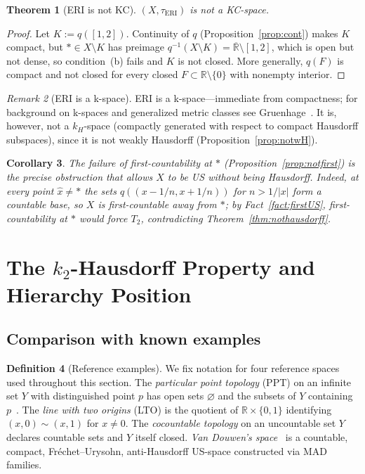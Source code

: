 \documentclass[11pt]{article}
\newtheorem{theorem}{Theorem}[section]
\newtheorem{corollary}[theorem]{Corollary}
\theoremstyle{definition}
\newtheorem{definition}[theorem]{Definition}
\theoremstyle{remark}
\newtheorem{remark}[theorem]{Remark}
\begin{document}
\begin{theorem}[ERI is not KC]\label{thm:notKC}
$(X, \tau_{\mathrm{ERI}})$ is not a KC-space.
\end{theorem}
\begin{proof}
Let $K := q([1, 2])$.
Continuity of $q$ (Proposition~\ref{prop:cont}) makes $K$ compact, but
$\ast \in X \setminus K$ has preimage
$q^{-1}(X \setminus K) = \overline{\mathbb{R}} \setminus [1, 2]$, which
is open but not dense, so condition~(b) fails and $K$ is not closed.
More generally, $q(F)$ is compact and not closed for every closed
$F \subset \mathbb{R}\setminus\{0\}$ with nonempty interior.
\end{proof}

\begin{remark}[ERI is a k-space]\label{rmk:kspace}
ERI is a k-space---immediate from compactness; for background on
k-spaces and generalized metric classes see
Gruenhage~\cite{bib:gruenhage}.
It is, however, not a $k_H$-space (compactly generated with respect to
compact Hausdorff subspaces), since it is not weakly Hausdorff
(Proposition~\ref{prop:notwH}).
\end{remark}

\begin{corollary}\label{cor:firstcountbarrier}
The failure of first-countability at $\ast$
(Proposition~\ref{prop:notfirst}) is the precise obstruction that
allows $X$ to be US without being Hausdorff. Indeed, at every point
$\hat{x} \neq \ast$ the sets $q((x-1/n, x+1/n))$ for $n > 1/|x|$
form a countable base, so $X$ is first-countable away from $\ast$;
by Fact~\ref{fact:firstUS}, first-countability at $\ast$ would force
$T_2$, contradicting Theorem~\ref{thm:nothausdorff}.
\end{corollary}

\section{The $k_2$-Hausdorff Property and Hierarchy Position}\label{sec:k2H}

\subsection{Comparison with known examples}\label{sec:compare}

\begin{definition}[Reference examples]\label{def:examples}
We fix notation for four reference spaces used throughout this section.
The \emph{particular point topology} (PPT) on an infinite set $Y$ with
distinguished point $p$ has open sets $\varnothing$ and the subsets of
$Y$ containing $p$~\cite[Ex.~8--9]{bib:steen}.
The \emph{line with two origins} (LTO) is the quotient of
$\mathbb{R} \times \{0, 1\}$ identifying $(x, 0) \sim (x, 1)$ for
$x \neq 0$.
The \emph{cocountable topology} on an uncountable set $Y$ declares
countable sets and $Y$ itself closed.
\emph{Van Douwen's space}~\cite{bib:vandouwen} is a countable, compact,
Fr\'{e}chet--Urysohn, anti-Hausdorff US-space constructed via MAD
families.
\end{definition}
\end{document}

